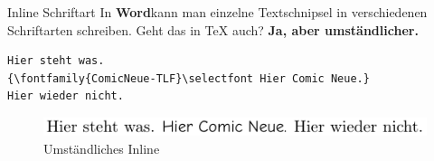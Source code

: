 \documentclass[14pt,aspectratio=169]{beamer}
\begin{document}
\begin{frame}[fragile]
\begin{columns}
\begin{overprint}
        \end{overprint}
                
        \material[height=.7\linewidth]{\fontcalatogue}        
    \end{columns}
\end{frame}

\begin{frame}[fragile]{\insertsubsection \small\quad Inline Schriftart}
    In \textbf{Word}\faFileWord kann man einzelne Textschnipsel in verschiedenen 
    Schriftarten schreiben. Geht das in TeX auch? \quad\textbf{Ja, aber umständlicher.}
    
    \begin{Beispiel}[Inline]
        \begin{verbatim}
Hier steht was. 
{\fontfamily{ComicNeue-TLF}\selectfont Hier Comic Neue.} 
Hier wieder nicht.
        \end{verbatim}
        
        \begin{figure}
            \includegraphics[width=.8\linewidth]{pictures/comicneue_inline.pdf}
            \caption{Umständliches Inline}
        \end{figure}
    \end{Beispiel}
\end{frame}
\end{document}

